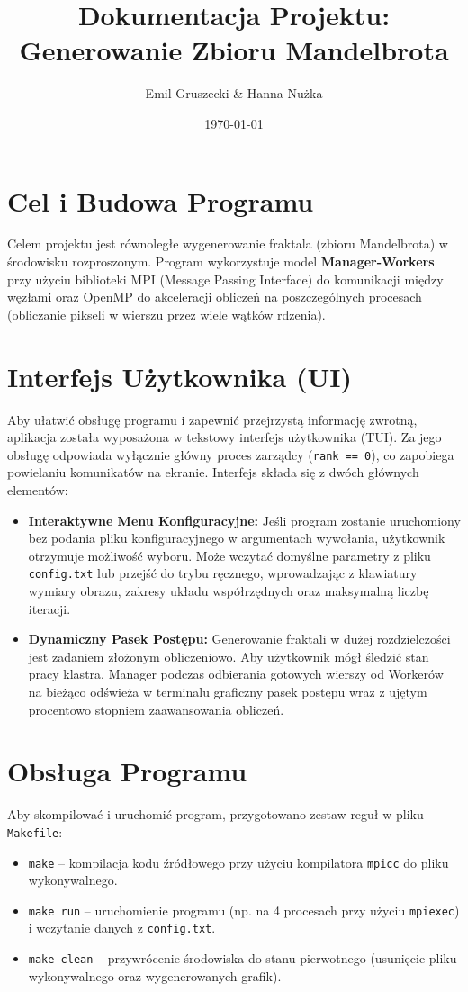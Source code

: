 \documentclass[12pt,a4paper]{article}
\title{Dokumentacja Projektu: Generowanie Zbioru Mandelbrota}
\author{Emil Gruszecki \& Hanna Nużka}
\date{\today}
\begin{document}
\maketitle

\section{Cel i Budowa Programu}
Celem projektu jest równoległe wygenerowanie fraktala (zbioru Mandelbrota) w środowisku rozproszonym. Program wykorzystuje model \textbf{Manager-Workers} przy użyciu biblioteki MPI (Message Passing Interface) do komunikacji między węzłami oraz OpenMP do akceleracji obliczeń na poszczególnych procesach (obliczanie pikseli w wierszu przez wiele wątków rdzenia).

\section{Interfejs Użytkownika (UI)}
Aby ułatwić obsługę programu i zapewnić przejrzystą informację zwrotną, aplikacja została wyposażona w tekstowy interfejs użytkownika (TUI). Za jego obsługę odpowiada wyłącznie główny proces zarządcy (\texttt{rank == 0}), co zapobiega powielaniu komunikatów na ekranie. Interfejs składa się z dwóch głównych elementów:

\begin{itemize}
    \item \textbf{Interaktywne Menu Konfiguracyjne:} Jeśli program zostanie uruchomiony bez podania pliku konfiguracyjnego w argumentach wywołania, użytkownik otrzymuje możliwość wyboru. Może wczytać domyślne parametry z pliku \texttt{config.txt} lub przejść do trybu ręcznego, wprowadzając z klawiatury wymiary obrazu, zakresy układu współrzędnych oraz maksymalną liczbę iteracji.
    \item \textbf{Dynamiczny Pasek Postępu:} Generowanie fraktali w dużej rozdzielczości jest zadaniem złożonym obliczeniowo. Aby użytkownik mógł śledzić stan pracy klastra, Manager podczas odbierania gotowych wierszy od Workerów na bieżąco odświeża w terminalu graficzny pasek postępu wraz z ujętym procentowo stopniem zaawansowania obliczeń.
\end{itemize}

\section{Obsługa Programu}
Aby skompilować i uruchomić program, przygotowano zestaw reguł w pliku \texttt{Makefile}:
\begin{itemize}
    \item \texttt{make} -- kompilacja kodu źródłowego przy użyciu kompilatora \texttt{mpicc} do pliku wykonywalnego.
    \item \texttt{make run} -- uruchomienie programu (np. na 4 procesach przy użyciu \texttt{mpiexec}) i wczytanie danych z \texttt{config.txt}.
    \item \texttt{make clean} -- przywrócenie środowiska do stanu pierwotnego (usunięcie pliku wykonywalnego oraz wygenerowanych grafik).
\end{itemize}
\end{document}
